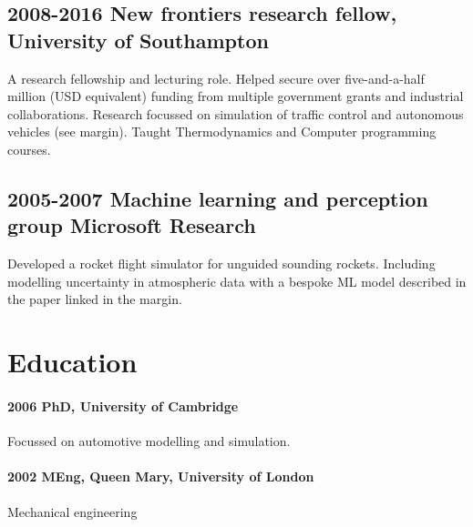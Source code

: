 \subsection{2008-2016 New frontiers research fellow, University of Southampton}


A research fellowship and lecturing role. Helped secure over five-and-a-half million (USD equivalent) funding from multiple government grants and industrial collaborations. Research focussed on simulation of traffic control and autonomous vehicles (see margin). Taught Thermodynamics and Computer programming courses.

\subsection{2005-2007 Machine learning and perception group Microsoft Research}

Developed a rocket flight simulator for unguided sounding rockets. Including modelling uncertainty in atmospheric data with a bespoke ML model described in the paper linked in the margin.

\section{Education}
\paragraph{2006 PhD, University of Cambridge}
Focussed on automotive modelling and simulation.
\paragraph{2002 MEng, Queen Mary, University of London}
Mechanical engineering
